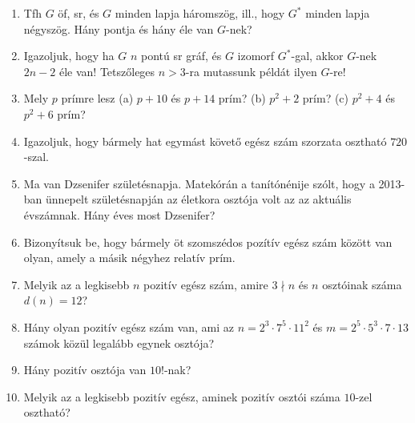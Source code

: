 \documentclass[a4paper, 12pt]{article}
\begin{document}
\begin{enumerate}
	\item Tfh $G$ öf, sr, és $G$ minden lapja háromszög, ill., hogy $G^*$ minden lapja négyszög. Hány pontja és hány éle van $G$-nek?
	\item Igazoljuk, hogy ha $G$ $n$ pontú sr gráf, és $G$ izomorf $G^*$-gal, akkor $G$-nek $2n-2$ éle van! Tetszőleges $n>3$-ra mutassunk példát ilyen $G$-re!
	
	\item Mely $p$ prímre lesz (a) $p+10$ és $p+14$ prím?  (b) $p^2+2$ prím?  (c) $p^2+4$ és $p^2+6$ prím? 
	\item Igazoljuk, hogy bármely hat egymást követő egész szám szorzata osztható $720$-szal.
	\item Ma van Dzsenifer születésnapja. Matekórán a tanítónénije szólt, hogy a 2013-ban  ünnepelt születésnapján az életkora osztója volt az az aktuális évszámnak. Hány éves most Dzsenifer?
	\item Bizonyítsuk be, hogy bármely öt szomszédos pozítív egész szám között van olyan, amely a másik négyhez relatív prím.
	\item Melyik az a legkisebb $n$ pozitív egész szám, amire $3\nmid n$ és $n$ osztóinak száma $d(n)=12$?
	\item Hány olyan pozitív egész szám van, ami az $n=2^3\cdot 7^5\cdot 11^2$ és $m=2^5\cdot 5^3\cdot 7\cdot 13$ számok közül legalább egynek osztója?
	\item Hány pozitív osztója van $10!$-nak?
	\item Melyik az a legkisebb pozitív egész, aminek pozitív osztói száma $10$-zel osztható?
	
\end{enumerate}
\end{document}
